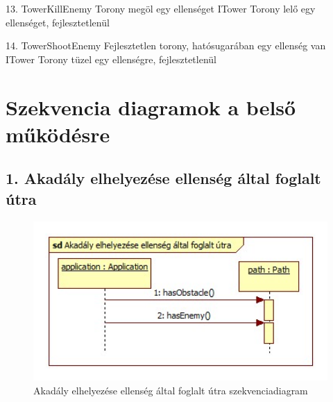 \usecaseteszteset
{13. TowerKillEnemy}
{Torony megöl egy ellenséget}
{ITower}
{Torony lelő egy ellenséget, fejlesztetlenül}

\usecaseteszteset
{14. TowerShootEnemy}
{Fejlesztetlen torony, hatósugarában egy ellenség van}
{ITower}
{Torony tüzel egy ellenségre, fejlesztetlenül}





\section{Szekvencia diagramok a belső működésre}

\subsection{1. Akadály elhelyezése ellenség által foglalt útra}
\begin{figure}[H]
\begin{center}
\includegraphics[width=17cm]{chapters/chapter05/images/sd_Akadaly_elhelyezese_ellenseg_altal_foglalt_utra.jpg}
\caption{Akadály elhelyezése ellenség által foglalt útra szekvenciadiagram}
\label{fig:sd_Akadaly_elhelyezese_ellenseg_altal_foglalt_utra}
\end{center}
\end{figure}

